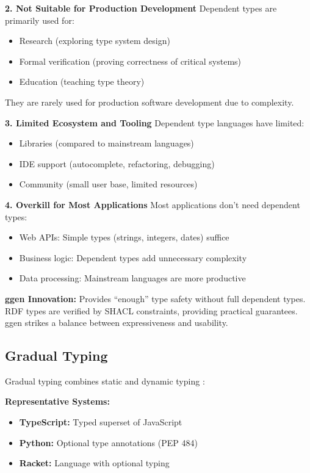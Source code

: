 \textbf{2. Not Suitable for Production Development}
Dependent types are primarily used for:
\begin{itemize}
    \item Research (exploring type system design)
    \item Formal verification (proving correctness of critical systems)
    \item Education (teaching type theory)
\end{itemize}

They are rarely used for production software development due to complexity.

\textbf{3. Limited Ecosystem and Tooling}
Dependent type languages have limited:
\begin{itemize}
    \item Libraries (compared to mainstream languages)
    \item IDE support (autocomplete, refactoring, debugging)
    \item Community (small user base, limited resources)
\end{itemize}

\textbf{4. Overkill for Most Applications}
Most applications don't need dependent types:
\begin{itemize}
    \item Web APIs: Simple types (strings, integers, dates) suffice
    \item Business logic: Dependent types add unnecessary complexity
    \item Data processing: Mainstream languages are more productive
\end{itemize}

\textbf{ggen Innovation:} Provides ``enough'' type safety without full dependent types. RDF types are verified by SHACL constraints, providing practical guarantees. ggen strikes a balance between expressiveness and usability.

\subsection{Gradual Typing}

Gradual typing combines static and dynamic typing \cite{siek2006gradual}:

\textbf{Representative Systems:}
\begin{itemize}
    \item \textbf{TypeScript:} Typed superset of JavaScript
    \item \textbf{Python:} Optional type annotations (PEP 484)
    \item \textbf{Racket:} Language with optional typing
\end{itemize}

